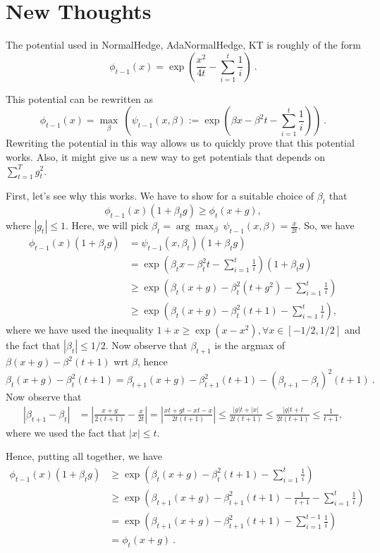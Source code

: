 \documentclass{article}
\begin{document}
\section{New Thoughts}

The potential used in NormalHedge, AdaNormalHedge, KT is roughly of the form
\[
\phi_{t-1}(x) = \exp\left( \frac{x^2}{4 t} - \sum_{i=1}^t \frac{1}{i}\right)~.
\]

This potential can be rewritten as
\[
\phi_{t-1}(x) = \max_{\beta} \ \left(\psi_{t-1}(x,
\beta):=\exp\left( \beta x -\beta^2 t - \sum_{i=1}^t \frac{1}{i}\right)\right)~.
\]
Rewriting the potential in this way allows us to quickly prove that this potential works. Also, it might give us a new way to get potentials that depends on $\sum_{t=1}^T g_t^2$.

First, let's see why this works. We have to show for a suitable choice of $\beta_t$ that
\[
\phi_{t-1}(x)(1+\beta_t g) \geq \phi_t(x+g),
\]
where $|g_t|\leq1$. Here, we will pick $\beta_t=\arg\max_\beta \ \psi_{t-1}(x,\beta) = \frac{x}{2t}$.
So, we have
\begin{align*}
\phi_{t-1}(x)(1+\beta_t g) 
&=\psi_{t-1}(x,\beta_t) (1+\beta_t g) \\
&=\exp\left( \beta_t x -\beta_t^2 t - \sum_{i=1}^t \frac{1}{i}\right) (1+\beta_t g) \\
&\geq \exp\left( \beta_t (x+g) -\beta_t^2 (t+g^2) - \sum_{i=1}^t \frac{1}{i}\right) \\
&\geq \exp\left( \beta_t (x+g) -\beta_t^2 (t+1) - \sum_{i=1}^t \frac{1}{i}\right),
\end{align*}
where we have used the inequality $1+x\geq \exp(x-x^2), \forall x \in [-1/2,1/2]$ and the fact that $|\beta_t|\leq 1/2$.
Now observe that $\beta_{t+1}$ is the argmax of $\beta(x+g)-\beta^2(t+1)$ wrt $\beta$, hence
\begin{equation}
\label{eq:quadratic}
\beta_t (x+g) -\beta_t^2 (t+1)
= \beta_{t+1} (x+g) -\beta_{t+1}^2 (t+1) - (\beta_{t+1}-\beta_t)^2 (t+1)~.
\end{equation}
Now observe that
\begin{align*}
\left| \beta_{t+1}-\beta_t\right|
&= \left| \frac{x+g}{2 (t+1)}-\frac{x}{2 t}\right| 
= \left| \frac{x t+g t - x t -x}{2 t(t+1)}\right| 
\leq \frac{|g| t +|x|}{2 t(t+1)} 
\leq \frac{|g| t +t}{2 t(t+1)} 
\leq \frac{1}{t+1},
\end{align*}
where we used the fact that $|x|\leq t$.

Hence, putting all together, we have
\begin{align*}
\phi_{t-1}(x)(1+\beta_t g) 
&\geq \exp\left( \beta_t (x+g) -\beta_t^2 (t+1) - \sum_{i=1}^t \frac{1}{i}\right) \\
&\geq \exp\left( \beta_{t+1} (x+g) -\beta_{t+1}^2 (t+1) - \frac{1}{t+1}- \sum_{i=1}^t \frac{1}{i}\right) \\
&= \exp\left( \beta_{t+1} (x+g) -\beta_{t+1}^2 (t+1) - \sum_{i=1}^{t-1} \frac{1}{i}\right) \\
&= \phi_{t}(x+g)~.
\end{align*}
\end{document}
